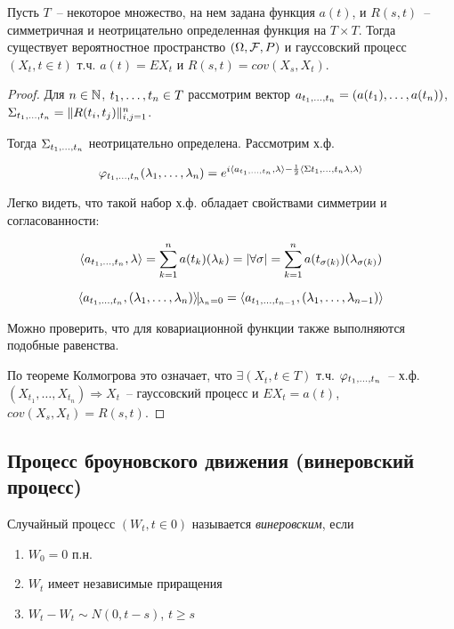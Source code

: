 \begin{theorem}
Пусть $T$~-- некоторое множество, на нем задана функция $a(t)$, и $R(s, t)$~-- симметричная и 
неотрицательно определенная функция на $T \times T$. Тогда существует вероятностное пространство
$(\Omega, \mathcal{F}, P)$ и гауссовский процесс $(X_t, t \in t)$ т.ч. $a(t) = EX_t$ и
$R(s,t) =  cov(X_s, X_t)$.
\end{theorem}
\begin{proof}
Для $n \in \mathbb{N}$, $t_{1}, \dots, t_{n}  \in T$  рассмотрим вектор $a_{t_{1}, \dots, t_{n}} =
(a(t_1), \dots, a(t_n))$, $\Sigma_{t_{1}, \dots, t_{n}} = \Vert R(t_i, t_j) \Vert^n_{i,j=1}$.

Тогда $\Sigma_{t_{1}, \dots, t_{n}}$ неотрицательно определена. Рассмотрим х.ф.

$$\varphi_{t_{1}, \dots, t_{n}}(\lambda_{1}, \dots, \lambda_{n}) = e^{i \langle a_{t_{1}, \dots, t_{n}}, \lambda\rangle -
\frac12\langle\Sigma{t_{1}, \dots, t_{n}}\lambda, \lambda\rangle}$$

Легко видеть, что такой набор х.ф. обладает свойствами симметрии и согласованности:

$$\langle a_{t_{1}, \dots, t_{n}}, \lambda \rangle
= \sum_{k=1}^n a(t_k)(\lambda_k) = |\forall \sigma| =
\sum_{k=1}^n a(t_{\sigma(k)})(\lambda_{\sigma(k)})$$

$$\langle a_{\seq t 1 n}, (\seq \lambda 1 n)\rangle \vline_{\lambda_n = 0} =
\langle a_{\seq t 1 {n-1}}, (\seq \lambda 1 {n-1}) \rangle$$

Можно проверить, что для ковариационной функции также выполняются подобные равенства.

По теореме Колмогрова это означает, что $\exists (X_t, t \in T)$ т.ч.
$\varphi_{t_{1}, \dots, t_{n}}$~-- х.ф. $(X_{t_1}, \dots, X_{t_n}) \Rightarrow X_t$~-- гауссовский 
процесс и $EX_t = a(t)$, $cov(X_s, X_t) = R(s,t)$.
\end{proof}

\subsection{Процесс броуновского движения (винеровский процесс)}

\begin{definition}
Случайный процесс $(W_t, t \in 0)$ называется \emph{винеровским}, если
\begin{enumerate}
\item $W_0 = 0$ п.н.
\item $W_t$ имеет независимые приращения
\item $W_t - W_t \sim N(0, t-s)$, $t \geq s$
\end{enumerate}
\end{definition}

